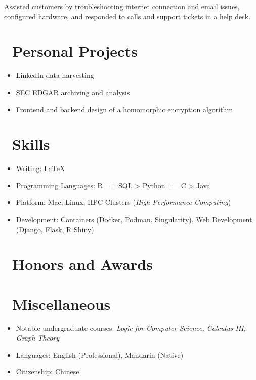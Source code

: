 \documentclass{resume}
\begin{document}
 {}
Assisted customers by troubleshooting internet connection and email issues, configured hardware, and responded to calls and support tickets in a help desk.


\section{\faUser\ Personal Projects}
\begin{itemize}[parsep=0.5ex]
  \item LinkedIn data harvesting
  \item SEC EDGAR archiving and analysis
  \item Frontend and backend design of a homomorphic encryption algorithm
\end{itemize}


\section{\faCogs\ Skills}
\begin{itemize}[parsep=0.5ex]
  \item Writing: \LaTeX
  \item Programming Languages: R == SQL > Python == C > Java
  \item Platform: Mac; Linux; HPC Clusters (\emph{High Performance Computing}) 
  \item Development: Containers (Docker, Podman, Singularity), Web Development (Django, Flask, R Shiny)
\end{itemize}


\section{\faHeartO\ Honors and Awards}



\section{\faInfo\ Miscellaneous}
\begin{itemize}[parsep=0.5ex]
  \item Notable undergraduate courses:
      \textit{Logic for Computer Science, Calculus III, Graph Theory}
  \item Languages: English (Professional), Mandarin (Native)
  \item Citizenship: Chinese
\end{itemize}



\phantom{}
\end{document}

